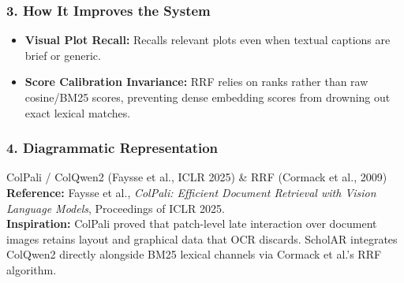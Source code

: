 \documentclass[11pt,a4paper]{article}
\begin{document}
\subsubsection{3. How It Improves the System}
\begin{itemize}[leftmargin=*]
    \item \textbf{Visual Plot Recall:} Recalls relevant plots even when textual captions are brief or generic.
    \item \textbf{Score Calibration Invariance:} RRF relies on ranks rather than raw cosine/BM25 scores, preventing dense embedding scores from drowning out exact lexical matches.
\end{itemize}

\subsubsection{4. Diagrammatic Representation}
\begin{center}
\end{center}

\begin{inspirationbox}{ColPali / ColQwen2 (Faysse et al., ICLR 2025) \& RRF (Cormack et al., 2009)}
\textbf{Reference:} Faysse et al., \emph{ColPali: Efficient Document Retrieval with Vision Language Models}, Proceedings of ICLR 2025.\\
\textbf{Inspiration:} ColPali proved that patch-level late interaction over document images retains layout and graphical data that OCR discards. ScholAR integrates ColQwen2 directly alongside BM25 lexical channels via Cormack et al.'s RRF algorithm.
\end{inspirationbox}
\end{document}
